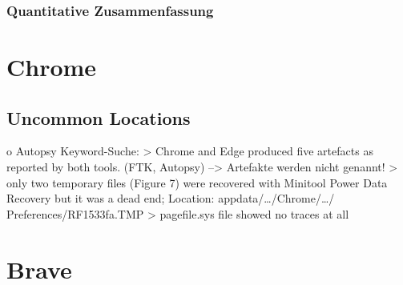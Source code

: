 \subsubsection*{Quantitative Zusammenfassung}



\section{Chrome}

\subsection*{Uncommon Locations}

o Autopsy Keyword-Suche: 
	> Chrome and Edge produced five artefacts as reported by both tools. (FTK, Autopsy) \cite{Gabet.2018}
		--> Artefakte werden nicht genannt!
	> only two temporary files (Figure 7) were recovered with Minitool Power Data Recovery but it was a dead end; Location: appdata/…/Chrome/…/ Preferences/RF1533fa.TMP \cite{Fayyad.2021}
	> pagefile.sys file showed no traces at all \cite{Said.2011}
	

\section{Brave}